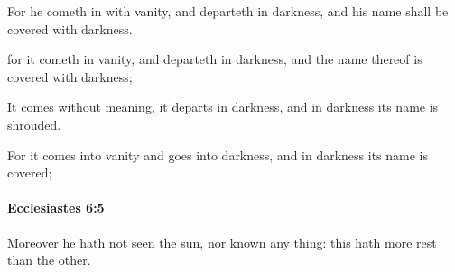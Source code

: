 			For he cometh in with vanity, and departeth in darkness, and his name shall be covered with darkness.

			\begin{versebox}
					\item[BHS] 
					\item[LXX] 
					\item[ASV] for it cometh in vanity, and departeth in darkness, and the name thereof is covered with darkness;
					\item[NIV] It comes without meaning, it departs in darkness, and in darkness its name is shrouded.
					\item[NRSV] For it comes into vanity and goes into darkness, and in darkness its name is covered;
			\end{versebox}

		\paragraph{Ecclesiastes 6:5} %
			\label{ECCLESIASTES-6-5}

			Moreover he hath not seen the sun, nor known any thing: this hath more rest than the other.

